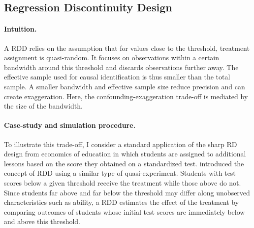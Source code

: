 \documentclass[usletter, 12pt]{article}
\begin{document}
		
		 \subsection{Regression Discontinuity Design}
		
     			\paragraph{Intuition.} A RDD relies on the assumption that for values close to the threshold, treatment assignment is quasi-random. It focuses on observations within a certain bandwidth around this threshold and discards observations further away. The effective sample used for causal identification is thus smaller than the total sample. A smaller bandwidth and effective sample size reduce precision and can create exaggeration. Here, the confounding-exaggeration trade-off is mediated by the size of the bandwidth. 

			\paragraph{Case-study and simulation procedure.} To illustrate this trade-off, I consider a standard application of the sharp RD design from economics of education in which students are assigned to additional lessons based on the score they obtained on a standardized test. \cite{thistlethwaite_regression-discontinuity_1960} introduced the concept of RDD using a similar type of quasi-experiment. Students with test scores below a given threshold receive the treatment while those above do not. Since students far above and far below the threshold may differ along unobserved characteristics such as ability, a RDD estimates the effect of the treatment by comparing outcomes of students whose initial test scores are immediately below and above this threshold. 
        
\end{document}
